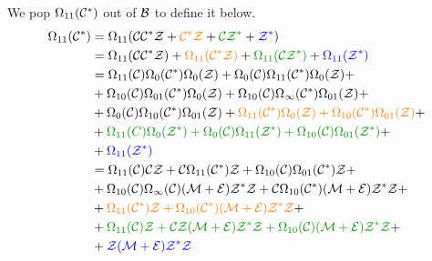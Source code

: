 \documentclass[12pt, a4paper, twoside]{report}
\begin{document}
We pop $\Omega_{11}(\mathcal{C}^*)$ out of $\mathcal{B}$ to define it below.
\begin{align}
  \begin{aligned}
  \Omega_{11}(\Cstar) &= \Omega_{11}(\C\Cstar\Z+ \textcolor{orange}{\Cstar\Z} + \textcolor{green}{\C\Z^*} + \textcolor{blue}{\Z^*})\\
                      &= \Omega_{11}(\C\Cstar\Z) + \textcolor{orange}{\Omega_{11}(\Cstar\Z)} + \textcolor{green}{\Omega_{11}(\C\Z^*)} + \textcolor{blue}{\Omega_{11}(\Z^*)}\\
                      &= \Omega_{11}(\C)\Omega_0(\Cstar)\Omega_0(\Z) + \Omega_0(\C)\Omega_{11}(\Cstar)\Omega_0(\Z) +\\
                      &+ \Omega_{10}(\C)\Omega_{01}(\Cstar)\Omega_0(\Z) + \Omega_{10}(\C)\Omega_\infty(\Cstar)\Omega_{01}(\Z) +\\
                      &+ \Omega_0(\C)\Omega_{10}(\Cstar)\Omega_{01}(\Z) + \textcolor{orange}{\Omega_{11}(\Cstar)\Omega_0(\Z) + \Omega_{10}(\Cstar)\Omega_{01}(\Z)} +\\
                      &+ \textcolor{green}{\Omega_{11}(C)\Omega_0(\Z^*) + \Omega_0(\C)\Omega_{11}(\Z^*) + \Omega_{10}(\C)\Omega_{01}(\Z^*)} +\\
                      &+ \textcolor{blue}{\Omega_{11}(\Z^*)}\\
                      &= \Omega_{11}(\C)\C\Z + \C\Omega_{11}(\Cstar)\Z + \Omega_{10}(\C)\Omega_{01}(\Cstar)\Z +\\
                      &+ \Omega_{10}(\C)\Omega_\infty(\C)(\M+\EE)\Z^*\Z +\C\Omega_{10}(\Cstar)(\M+\EE)\Z^*\Z + \\
                      &+ \textcolor{orange}{\Omega_{11}(\Cstar)\Z + \Omega_{10}(\Cstar)(\M+\EE)\Z^*\Z} +\\
                      &+ \textcolor{green}{\Omega_{11}(\C)\Z + \C\Z(\M+\EE)\Z^*\Z + \Omega_{10}(\C)(\M+\EE)\Z^*\Z} +\\
                      &+\textcolor{blue}{\Z(\M+\EE)\Z^*\Z}\\
                    \end{aligned}
                        \label{eq:exampleAv321Av21_omega11Cstar}
\end{align}
\end{document}
